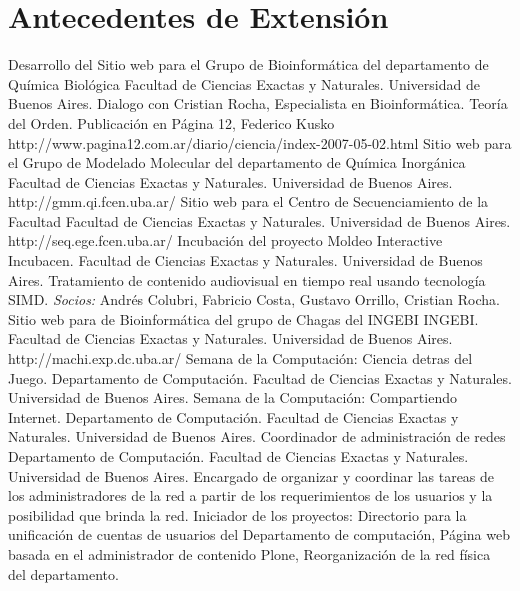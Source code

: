 \label{cientificos:hasta}

\section{Antecedentes de Extensión}\label{extension:desde}

	{Desarrollo del Sitio web para el Grupo de Bioinformática del departamento de Química Biológica}
	{Facultad de Ciencias Exactas y Naturales. Universidad de Buenos Aires. }
	{}
	{}
	{}
	{Dialogo con Cristian Rocha, Especialista en Bioinformática. Teoría del Orden.}
	{Publicación en Página 12, Federico Kusko}
	{}
	{}
	{http://www.pagina12.com.ar/diario/ciencia/index-2007-05-02.html}
	{Sitio web para el Grupo de Modelado Molecular del departamento de Química Inorgánica}
	{Facultad de Ciencias Exactas y Naturales. Universidad de Buenos Aires.}
	{}
	{}
	{http://gmm.qi.fcen.uba.ar/}
	{Sitio web para el Centro de Secuenciamiento de la Facultad}
	{Facultad de Ciencias Exactas y Naturales. Universidad de Buenos Aires.}
	{}
	{}
	{http://seq.ege.fcen.uba.ar/}
	{Incubación del proyecto Moldeo Interactive}
	{Incubacen. Facultad de Ciencias Exactas y Naturales. Universidad de Buenos Aires.}
	{}
	{}
	{Tratamiento de contenido audiovisual en tiempo real usando tecnología SIMD. \emph{Socios:} Andrés Colubri, Fabricio Costa, Gustavo Orrillo, Cristian Rocha.}
	{Sitio web para de Bioinformática del grupo de Chagas del INGEBI}
	{INGEBI. Facultad de Ciencias Exactas y Naturales. Universidad de Buenos Aires. }
	{}
	{}
	{http://machi.exp.dc.uba.ar/}
	{Semana de la Computación: Ciencia detras del Juego.}
	{Departamento de Computación. Facultad de Ciencias Exactas y Naturales. Universidad de Buenos Aires.}
	{}
	{}
	{}
	{Semana de la Computación: Compartiendo Internet.}
	{Departamento de Computación. Facultad de Ciencias Exactas y Naturales. Universidad de Buenos Aires.}
	{}
	{}
	{}
	{Coordinador de administración de redes}
	{Departamento de Computación. Facultad de Ciencias Exactas y Naturales. Universidad de Buenos Aires.}
	{}
	{}
	{Encargado de organizar y coordinar las tareas de los
 	administradores de la red a partir de los requerimientos de los usuarios y
 	la posibilidad que brinda la red. Iniciador de los proyectos: Directorio
 	para la unificación de cuentas de usuarios del Departamento de computación,
 	Página web basada en el administrador de contenido Plone, Reorganización
	de la red física del departamento.}
\label{extension:hasta}

